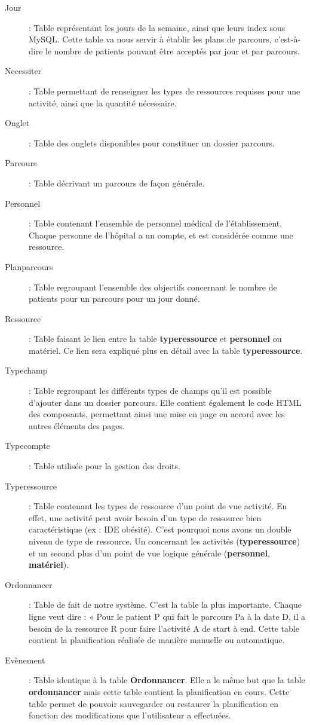 \documentclass[noposter]{polytech/polytech}
\begin{document}
\begin{description}
	\item[Jour] : Table représentant les jours de la semaine, ainsi que leurs index sous MySQL. Cette table va nous servir à établir les plans de parcours, c'est-à-dire le nombre de patients pouvant être acceptés par jour et par parcours.
	\item[Necessiter] : Table permettant de renseigner les types de ressources requises pour une activité, ainsi que la quantité nécessaire.
	\item[Onglet] : Table des onglets disponibles pour constituer un dossier parcours.
	\item[Parcours]	 : Table décrivant un parcours de façon générale.
	\item[Personnel] : Table contenant l'ensemble de personnel médical de l'établissement. Chaque personne de l'hôpital a un compte, et est considérée comme une ressource.
	\item[Planparcours] : Table regroupant l'ensemble des objectifs concernant le nombre de patients pour un parcours pour un jour donné.
	\item[Ressource] : Table faisant le lien entre la table \textbf{typeressource} et \textbf{personnel} ou matériel. Ce lien sera expliqué plus en détail avec la table \textbf{typeressource}.
	\item[Typechamp] : Table regroupant les différents types de champs qu'il est possible d'ajouter dans un dossier parcours. Elle contient également le code HTML des composants, permettant ainsi une mise en page en accord avec les autres éléments des pages.
	\item[Typecompte] : Table utilisée pour la gestion des droits.
	\item[Typeressource] : Table contenant les types de ressource d'un point de vue activité. En effet, une activité peut avoir besoin d'un type de ressource bien caractéristique (ex : IDE obésité). C'est pourquoi nous avons un double niveau de type de ressource. Un concernant les activités (\textbf{typeressource}) et un second plus d'un point de vue logique générale (\textbf{personnel}, \textbf{matériel}).
	\item[Ordonnancer] : Table de fait de notre système. C'est la table la plus importante. Chaque ligne veut dire : « Pour le patient P qui fait le parcours Pa à la date D, il a besoin de la ressource R pour faire l'activité A de start à end. Cette table contient la planification réalisée de manière manuelle ou automatique.
	\item[Evènement] : Table identique à la table \textbf{Ordonnancer}. Elle a le même but que la table \textbf{ordonnancer} mais cette table contient la planification en cours. Cette table permet de pouvoir sauvegarder ou restaurer la planification en fonction des modifications que l'utilisateur a effectuées.
\end{description}
\end{document}
